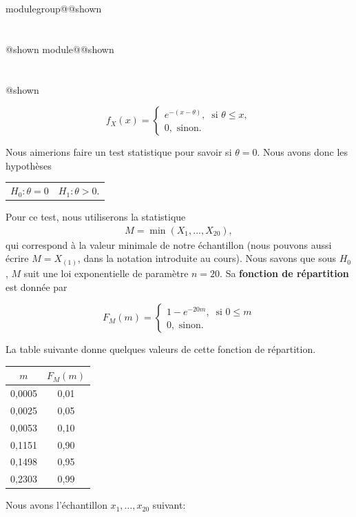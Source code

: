 \documentclass{Evaluation}
\makeatletter
\newcommand{\currentmodulekey}{}
\newcommand{\currentmoduletitle}{}
\newcommand{\currentgroupkey}{}
\newcommand{\currentgrouptitle}{}
\newcommand{\showmoduleifneeded}{%
  \ifx\currentgroupkey\empty\else
    \expandafter\ifx\csname modulegroup@\currentgroupkey @shown\endcsname\relax
      \section*{\currentgrouptitle}%
      \expandafter\gdef\csname modulegroup@\currentgroupkey @shown\endcsname{1}%
    \fi
  \fi
  \expandafter\ifx\csname module@\currentmodulekey @shown\endcsname\relax
    \section*{\currentmoduletitle}%
    \expandafter\gdef\csname module@\currentmodulekey @shown\endcsname{1}%
  \fi
}
\newenvironment{H23}{\showmoduleifneeded}{}
\makeatother
\begin{document}
\begin{questions}
\begin{H23}
 \begin{equation*}
  f_X(x) = \begin{cases}
         e^{-(x-\theta)},\ \text{  si  } \theta \leq x , \\
        0, \text{ sinon.}
        \end{cases}
 \end{equation*}

Nous aimerions faire un test statistique pour savoir si $\theta=0$. Nous avons donc les hypothèses

\begin{table}[ht]
    \centering
    \begin{tabular}{cc}
         $H_0: \theta=0$ & $H_1: \theta > 0$.
    \end{tabular}
\end{table}
Pour ce test, nous utiliserons la statistique
\begin{align*}
    M=\min (X_1,...,X_{20}),
\end{align*}
qui correspond à la valeur minimale de notre échantillon (nous pouvons aussi écrire $M=X_{(1)}$, dans la notation introduite au cours).
Nous savons que sous $H_0$, $M$ suit une loi exponentielle de paramètre $n=20$. Sa \textbf{fonction de répartition} est donnée par

 \begin{equation*}
  F_M(m) = \begin{cases}
         1-e^{-20m},\ \text{  si  } 0\leq m \\
        0, \text{ sinon.}
        \end{cases}
 \end{equation*}

La table suivante donne quelques valeurs de cette fonction de répartition.
\begin{table}[ht]
    \centering
\begin{tabular}{|cc|}
  \hline
 $m$ & $F_M(m)$ \\
  \hline
    0,0005 & 0,01 \\
    0,0025 & 0,05 \\
    0,0053 & 0,10 \\
    0,1151 & 0,90 \\
    0,1498 & 0,95 \\
    0,2303 & 0,99 \\
  \hline
\end{tabular}
\end{table}

Nous avons l'échantillon $x_1,\hdots,x_{20}$ suivant:


\end{H23}
\end{questions}
\end{document}
